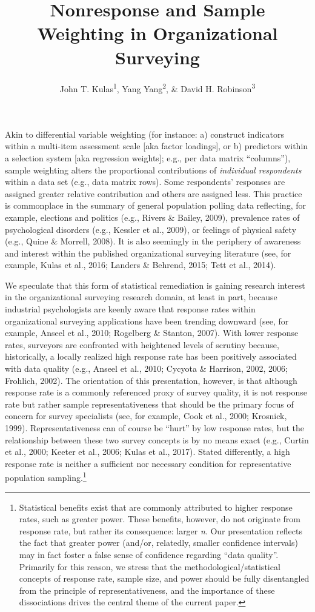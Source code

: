 \documentclass[
  man,mask]{apa7}
\title{Nonresponse and Sample Weighting in Organizational Surveying}
\author{John T. Kulas\textsuperscript{1}, Yang Yang\textsuperscript{2}, \& David H. Robinson\textsuperscript{3}}
\date{}
\affiliation{\vspace{0.5cm}\textsuperscript{1} Montclair State University\\\textsuperscript{2} Roche Group\\\textsuperscript{3} St.~Cloud State University}
\begin{document}
\maketitle

Akin to differential variable weighting (for instance: a) construct indicators within a multi-item assessment scale {[}aka factor loadings{]}, or b) predictors within a selection system {[}aka regression weights{]}; e.g., per data matrix ``columns''), sample weighting alters the proportional contributions of \emph{individual respondents} within a data set (e.g., data matrix rows). Some respondents' responses are assigned greater relative contribution and others are assigned less. This practice is commonplace in the summary of general population polling data reflecting, for example, elections and politics (e.g., Rivers \& Bailey, 2009), prevalence rates of psychological disorders (e.g., Kessler et al., 2009), or feelings of physical safety (e.g., Quine \& Morrell, 2008). It is also seemingly in the periphery of awareness and interest within the published organizational surveying literature (see, for example, Kulas et al., 2016; Landers \& Behrend, 2015; Tett et al., 2014).

We speculate that this form of statistical remediation is gaining research interest in the organizational surveying research domain, at least in part, because industrial psychologists are keenly aware that response rates within organizational surveying applications have been trending downward (see, for example, Anseel et al., 2010; Rogelberg \& Stanton, 2007). With lower response rates, surveyors are confronted with heightened levels of scrutiny because, historically, a locally realized high response rate has been positively associated with data quality (e.g., Anseel et al., 2010; Cycyota \& Harrison, 2002, 2006; Frohlich, 2002). The orientation of this presentation, however, is that although response rate is a commonly referenced proxy of survey quality, it is not response rate but rather sample representativeness that should be the primary focus of concern for survey specialists (see, for example, Cook et al., 2000; Krosnick, 1999). Representativeness can of course be ``hurt'' by low response rates, but the relationship between these two survey concepts is by no means exact (e.g., Curtin et al., 2000; Keeter et al., 2006; Kulas et al., 2017). Stated differently, a high response rate is neither a sufficient nor necessary condition for representative population sampling.\footnote{Statistical benefits exist that are commonly attributed to higher response rates, such as greater power. These benefits, however, do not originate from response rate, but rather its consequence: larger \emph{n}. Our presentation reflects the fact that greater power (and/or, relatedly, smaller confidence intervals) may in fact foster a false sense of confidence regarding ``data quality''. Primarily for this reason, we stress that the methodological/statistical concepts of response rate, sample size, and power should be fully disentangled from the principle of representativeness, and the importance of these dissociations drives the central theme of the current paper.}
\end{document}
